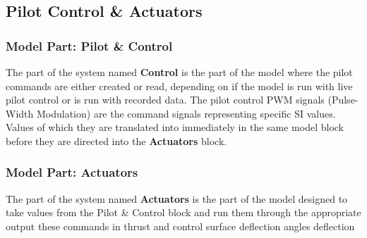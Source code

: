 \subsection{Pilot Control	 \& Actuators}

\subsubsection{Model Part: Pilot \& Control}

The part of the system named \textbf{Control} is the part of the model where the pilot commands are either created or read, depending on if the model is run with live pilot control or is run with recorded data. The pilot control PWM signals (Pulse-Width Modulation) are the command signals representing specific SI values. Values of which they are translated into immediately in the same model block before they are directed into the \textbf{Actuators} block.

\subsubsection{Model Part: Actuators}

The part of the system named \textbf{Actuators} is the part of the model designed to take values from the Pilot \& Control block and run them through the appropriate  output these commands in thrust and control surface deflection angles deflection
